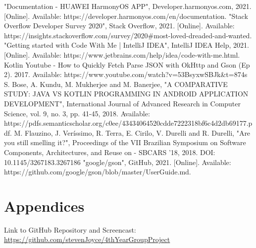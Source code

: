\begin{thebibliography}{MT1}
"Documentation - HUAWEI HarmonyOS APP", Developer.harmonyos.com, 2021. [Online]. Available: https://developer.harmonyos.com/en/documentation. 
"Stack Overflow Developer Survey 2020", Stack Overflow, 2021. [Online]. Available: https://insights.stackoverflow.com/survey/2020\#most-loved-dreaded-and-wanted.
"Getting started with Code With Me | IntelliJ IDEA", IntelliJ IDEA Help, 2021. [Online]. Available: https://www.jetbrains.com/help/idea/code-with-me.html.
Kotlin Youtube - How to Quickly Fetch Parse JSON with OkHttp and Gson (Ep 2). 2017. Available: https://www.youtube.com/watch?v=53BsyxwSBJk\&t=874s
S. Bose, A. Kundu, M. Mukherjee and M. Banerjee, "A COMPARATIVE STUDY: JAVA VS KOTLIN PROGRAMMING IN ANDROID APPLICATION DEVELOPMENT", International Journal of Advanced Research in Computer Science, vol. 9, no. 3, pp. 41-45, 2018. Available: https://pdfs.semanticscholar.org/c0ee/43434064520cdde7222318bf6c4d2db69177.pdf.
 M. Flauzino, J. Veríssimo, R. Terra, E. Cirilo, V. Durelli and R. Durelli, "Are you still smelling it?", Proceedings of the VII Brazilian Symposium on Software Components, Architectures, and Reuse on - SBCARS '18, 2018. DOI: 10.1145/3267183.3267186
"google/gson", GitHub, 2021. [Online]. Available: https://github.com/google/gson/blob/master/UserGuide.md.
\end{thebibliography}


\chapter{Appendices}
Link to GitHub Repository and Screencast: {\url{https://github.com/stevenJoyce/4thYearGroupProject}}

